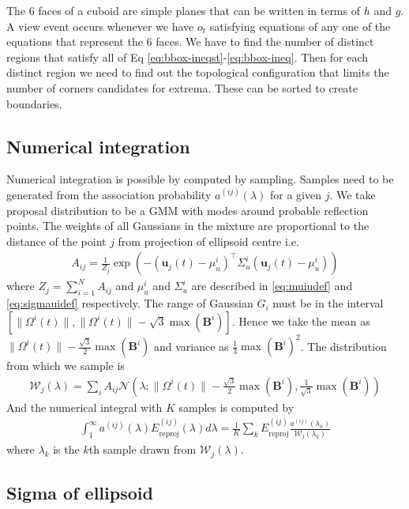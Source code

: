 \documentclass[10pt,twocolumn,letterpaper]{article}
\newcommand{\relp}[2]{\Omega^{#1}(#2)}
\newcommand{\trackpj}[1]{\mathbf{u}_j(#1)}
\newcommand{\dimsn}[1]{\mathbf{B}^{#1}}
\newcommand{\assocP}{a^{(ij)}(\lambda)}
\newcommand{\assocPk}{a^{(ij)}(\lambda_k)}
\newcommand{\Ereproj}{E^{(ij)}_{\text{reproj}}}
\newcommand{\Gauss}{\mathcal{N}}
\newcommand{\PropDist}{\mathcal{W}_j}
\begin{document}
The 6 faces of a cuboid are simple planes that can be written in terms of $h$
and $g$. A view event occurs whenever we have $o_t$ satisfying equations of any
one of the equations that represent the 6 faces. We have to find the number of
distinct regions that satisfy all of Eq
\eqref{eq:bbox-ineqst}-\eqref{eq:bbox-ineq}. Then for each distinct region we
need to find out the topological configuration that limits the number of
corners candidates for extrema. These can be sorted to create boundaries.


\subsection{Numerical integration}
Numerical integration is possible by computed by sampling. Samples need to be
generated from the association probability $\assocP$ for a given $j$. We take
proposal distribution to be a GMM with modes around probable reflection points.
The weights of all Gaussians in the mixture are proportional to the distance of
the point $j$ from projection of ellipsoid centre i.e. 
\begin{align}
  A_{ij} = \frac{1}{Z_j}\exp(-(\trackpj{t} - \mu^i_u)^\top\Sigma_u^i(\trackpj{t} - \mu^i_u))
\end{align}
where $Z_j = \sum_{i=1}^N A_{ij}$ and $\mu^i_u$ and $\Sigma_u^i$ are described in \eqref{eq:muiudef} and \eqref{eq:sigmauidef} respectively.
The range of Gaussian $G_i$
must be in the interval $[\|\relp{i}{t}\|, \|\relp{i}{t}\| -
\sqrt{3}\max(\dimsn{i})]$. Hence we take the mean as $\|\relp{i}{t}\| -
\frac{\sqrt{3}}{2}\max(\dimsn{i})$ and variance as
$\frac{1}{3}\max(\dimsn{i})^2$. The distribution from which we sample is 
\begin{align}
  \PropDist(\lambda) = \sum_i A_{ij} \Gauss(\lambda; \|\relp{i}{t}\| -
  \frac{\sqrt{3}}{2}\max(\dimsn{i}), \frac{1}{\sqrt{3}}\max(\dimsn{i}))
\end{align}
And the numerical integral with $K$ samples is computed by
\begin{align}
    \int_1^{\infty}
    \assocP
    \Ereproj(\lambda)
    d\lambda
    =
    \frac{1}{K}\sum_k \Ereproj \frac{\assocPk}{\PropDist(\lambda_k)}
\end{align}
where $\lambda_k$ is the $k$th sample drawn from $\PropDist(\lambda)$.

\subsection{Sigma of ellipsoid}
\label{sec:sigmacomputation}
\end{document}
